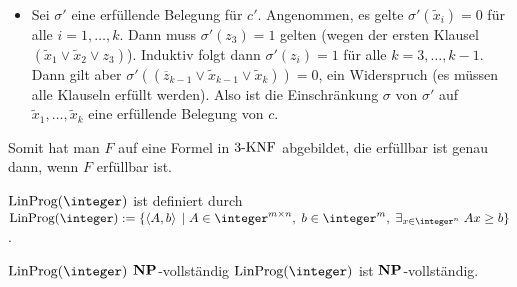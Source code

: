 \begin{Beweis}
\begin{itemize}
        \item
        Sei $\sigma'$ eine erfüllende Belegung für $c'$.
        Angenommen, es gelte $\sigma'(\widetilde{x}_i) = 0$ für alle $i = 1, \dotsc, k$.
        Dann muss $\sigma'(z_3) = 1$ gelten (wegen der ersten Klausel
        $(\widetilde{x}_1 \lor \widetilde{x}_2 \lor z_3)$).
        Induktiv folgt dann $\sigma'(z_i) = 1$ für alle $k = 3, \dotsc, k - 1$.
        Dann gilt aber
        $\sigma'((\overline{z}_{k-1} \lor \widetilde{x}_{k-1} \lor \widetilde{x}_k)) = 0$,
        ein Widerspruch (es müssen alle Klauseln erfüllt werden).
        Also ist die Einschränkung $\sigma$ von $\sigma'$ auf
        $\widetilde{x}_1, \dotsc, \widetilde{x}_k$ eine erfüllende Belegung von $c$.
    \end{itemize}
    Somit hat man $F$ auf eine Formel in $3\text{-}\text{KNF}$ abgebildet, die erfüllbar ist genau dann,
    wenn $F$ erfüllbar ist.
\end{Beweis}

\linie

\begin{Def}{$\LinProg(\integer)$}
    \begriff{$\LinProg(\integer)$} ist definiert durch\\
    $\LinProg(\integer) := \{\kod{A, b} \;|\; A \in \integer^{m \times n},\;
    b \in \integer^m,\; \exists_{x \in \integer^n}\; Ax \ge b\}$.
\end{Def}

\begin{Satz}{$\LinProg(\integer)$ $\mathbf{NP}$-vollständig}
    $\LinProg(\integer)$ ist $\mathbf{NP}$-vollständig.
\end{Satz}

